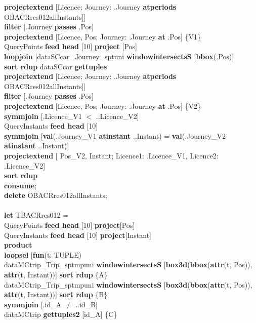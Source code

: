 \documentclass[a4paper]{article}
\newcommand{\op}[1]{\textbf{#1}}
\begin{document}
\begin{scriptsize}
\begin{tabbing}
\>\>\>\op{projectextend} [Licence; Journey: .Journey \op{atperiods} OBACRres012allInstants]]\\
\>\>\op{filter} [.Journey \op{passes} .Pos]\\
\>\>\op{projectextend} [Licence, Pos; Journey: .Journey \op{at} .Pos] \{V1\}\\
\>QueryPoints \op{feed head} [10] \op{project} [Pos]\\
\>\>\op{loopjoin} [dataSCcar\_Journey\_sptuni \op{windowintersectsS} [\op{bbox}(.Pos)]\\
\>\>\>\op{sort rdup} dataSCcar \op{gettuples}\\
\>\>\>\op{projectextend} [Licence; Journey: .Journey \op{atperiods} OBACRres012allInstants]]\\
\>\>\op{filter} [.Journey \op{passes} .Pos]\\
\>\>\op{projectextend} [Licence, Pos; Journey: .Journey \op{at} .Pos] \{V2\}\\
\>\op{symmjoin} [.Licence\_V1 $<$ ..Licence\_V2]\\
\>QueryInstants \op{feed head} [10]\\
\>\op{symmjoin} [\op{val}(.Journey\_V1 \op{atinstant} ..Instant) = \op{val}(.Journey\_V2 \op{atinstant} ..Instant)]\\
\>\op{projectextend} [ Pos\_V2, Instant; Licence1: .Licence\_V1, Licence2: .Licence\_V2]\\
\>\op{sort rdup}\\
\op{consume};\\
\op{delete} OBACRres012allInstants;\\
\\
\op{let} TBACRres012 =\\
\>QueryPoints \op{feed head} [10] \op{project}[Pos]\\
\>QueryInstants \op{feed head} [10] \op{project}[Instant]\\
\>\op{product}\\
\>\op{loopsel} [\op{fun}(t: TUPLE)\\
\>\>dataMCtrip\_Trip\_sptmpuni \op{windowintersectsS} [\op{box3d}(\op{bbox}(\op{attr}(t, Pos)), \op{attr}(t, Instant))] \op{sort rdup} \{A\}\\
\>\>dataMCtrip\_Trip\_sptmpuni \op{windowintersectsS} [\op{box3d}(\op{bbox}(\op{attr}(t, Pos)), \op{attr}(t, Instant))] \op{sort rdup} \{B\}\\
\>\>\op{symmjoin} [.id\_A $\neq$ ..id\_B]\\
\>\>dataMCtrip \op{gettuples2} [id\_A] \{C\}\\

\end{tabbing}
\end{scriptsize}
\end{document}
